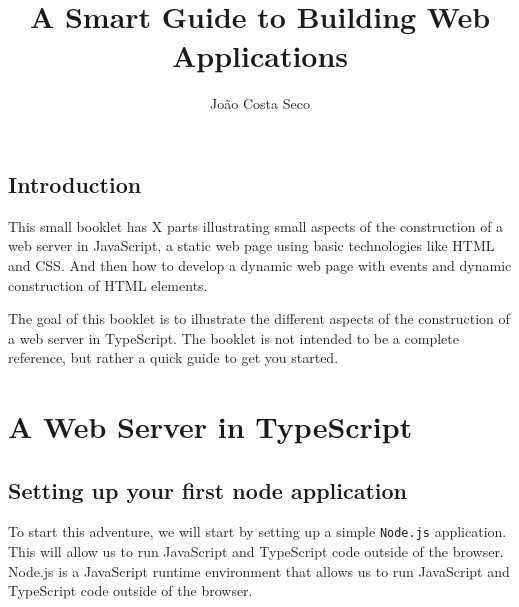 \documentclass[12pt,a5paper]{memoir}
\title{A Smart Guide to Building Web Applications}
\author{João Costa Seco}
\begin{document}
\maketitle

\tableofcontents

\chapter{Introduction}

This small booklet has X parts illustrating small aspects of the construction of
a web server in JavaScript, a static web page using basic technologies like HTML
and CSS. And then how to develop a dynamic web page with events and dynamic
construction of HTML elements. 

The goal of this booklet is to illustrate the different aspects of the
construction of a web server in TypeScript. The booklet is not intended to be a
complete reference, but rather a quick guide to get you started.

\part{A Web Server in TypeScript}

\chapter{Setting up your first node application}

To start this adventure, we will start by setting up a simple \texttt{Node.js}
application. This will allow us to run JavaScript and TypeScript code outside of
the browser. Node.js is a JavaScript runtime environment that allows us to run
JavaScript and TypeScript code outside of the browser.
\end{document}

